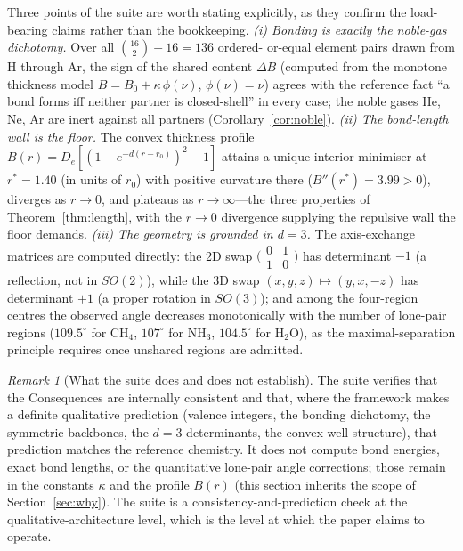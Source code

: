 \documentclass[11pt,a4paper]{article}
\theoremstyle{thmstyle}
\theoremstyle{definition}
\theoremstyle{remark}
\newtheorem{remark}[theorem]{Remark}
\newcommand{\thick}{B}                 %
\begin{document}
Three points of the suite are worth stating explicitly, as they confirm
the load-bearing claims rather than the bookkeeping. \emph{(i) Bonding is
exactly the noble-gas dichotomy.} Over all $\binom{16}{2}+16=136$ ordered-%
or-equal element pairs drawn from H through Ar, the sign of the shared
content $\Delta\thick$ (computed from the monotone thickness model
$\thick=\thick_0+\kappa\,\phi(\nu)$, $\phi(\nu)=\nu$) agrees with the
reference fact ``a bond forms iff neither partner is closed-shell'' in
every case; the noble gases He, Ne, Ar are inert against all partners
(Corollary~\ref{cor:noble}). \emph{(ii) The bond-length wall is the
floor.} The convex thickness profile $\thick(r)=D_e[(1-e^{-d(r-r_0)})^2-1]$
attains a unique interior minimiser at $r^{*}=1.40$ (in units of $r_0$)
with positive curvature there ($\thick''(r^{*})=3.99>0$), diverges as
$r\to0$, and plateaus as $r\to\infty$---the three properties of
Theorem~\ref{thm:length}, with the $r\to0$ divergence supplying the
repulsive wall the floor demands. \emph{(iii) The geometry is grounded in
$d=3$.} The axis-exchange matrices are computed directly: the 2D swap
$\bigl(\begin{smallmatrix}0&1\\1&0\end{smallmatrix}\bigr)$ has
determinant $-1$ (a reflection, not in $SO(2)$), while the 3D swap
$(x,y,z)\mapsto(y,x,-z)$ has determinant $+1$ (a proper rotation in
$SO(3)$); and among the four-region centres the observed angle decreases
monotonically with the number of lone-pair regions ($109.5^\circ$ for
CH$_4$, $107^\circ$ for NH$_3$, $104.5^\circ$ for H$_2$O), as the
maximal-separation principle requires once unshared regions are admitted.

\begin{remark}[What the suite does and does not establish]
\label{rem:validation-scope}
The suite verifies that the Consequences are internally consistent and
that, where the framework makes a definite qualitative prediction
(valence integers, the bonding dichotomy, the symmetric backbones, the
$d=3$ determinants, the convex-well structure), that prediction matches
the reference chemistry. It does not compute bond energies, exact bond
lengths, or the quantitative lone-pair angle corrections; those remain in
the constants $\kappa$ and the profile $\thick(r)$
(this section inherits the scope of Section~\ref{sec:why}). The suite is
a consistency-and-prediction check at the qualitative-architecture level,
which is the level at which the paper claims to operate.
\end{remark}
\end{document}
